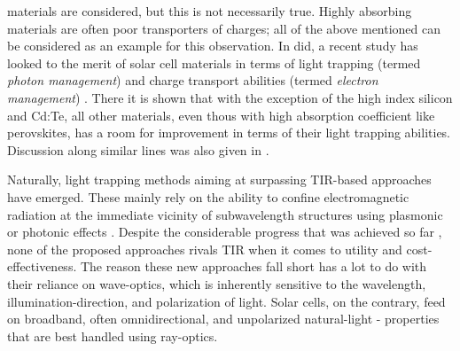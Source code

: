 \documentclass[a4paper]{article}
\begin{document}
materials are considered, but this is not necessarily true. Highly absorbing materials are often poor transporters of charges; all of the above mentioned can be considered as an example for this observation. In did, a recent study has looked to the merit of solar cell materials in terms of light trapping (termed \emph{photon management}) and charge transport abilities (termed \emph{electron management}) \cite{Polman2016}. There it is shown that with the exception of the high index silicon and Cd:Te, all other materials, even thous with high absorption coefficient like perovskites, has a room for improvement in terms of their light trapping abilities. Discussion along similar lines was also given in \cite{Green2016}.

Naturally, light trapping methods aiming at surpassing TIR-based approaches have emerged. These mainly rely on the ability to confine electromagnetic radiation at the immediate vicinity of subwavelength structures using plasmonic or photonic effects \cite{Atwater2010a, Polman2012a}. Despite the considerable progress that was achieved so far \cite{Pala2009, Massiot2012}, none of the proposed approaches rivals TIR when it comes to utility and cost-effectiveness. The reason these new approaches fall short has a lot to do with their reliance on wave-optics, which is inherently sensitive to the wavelength, illumination-direction, and polarization of light. Solar cells, on the contrary, feed on broadband, often omnidirectional, and unpolarized natural-light - properties that are best handled using ray-optics.  
\end{document}
